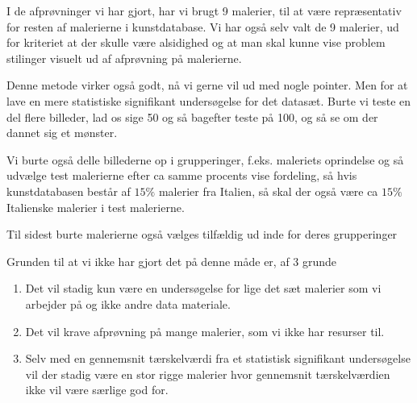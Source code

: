 I de afprøvninger vi har gjort, har vi brugt 9 malerier, til at være
repræsentativ for resten af malerierne i kunstdatabase. Vi har også selv
valt de 9 malerier, ud for kriteriet at der skulle være alsidighed og at
man skal kunne vise problem stilinger visuelt ud af afprøvning på
malerierne.

Denne metode virker også godt, nå vi gerne vil ud med nogle pointer.
Men for at lave en mere statistiske signifikant undersøgelse for det
datasæt. Burte vi teste en del flere billeder, lad os sige 50 og
så bagefter teste på 100, og så se om der dannet sig et mønster. 

Vi burte også delle billederne op i grupperinger, f.eks. maleriets
oprindelse og så udvælge test malerierne efter ca samme procents vise
fordeling, så hvis kunstdatabasen består af $15 \%$ malerier fra
Italien, så skal der også være ca $15 \%$ Italienske malerier i test
malerierne.

Til sidest burte malerierne også vælges tilfældig ud inde for deres
grupperinger

Grunden til at vi ikke har gjort det på denne måde er, af 3 grunde

\begin{enumerate}
	\item Det vil stadig kun være en undersøgelse for lige det sæt
	malerier som vi arbejder på og ikke andre data materiale.
	\item Det vil krave afprøvning på mange malerier, som vi ikke har
	resurser til. 
	\item Selv med en gennemsnit tærskelværdi fra et statistisk
	signifikant undersøgelse vil der stadig være en stor rigge malerier
	hvor gennemsnit tærskelværdien ikke vil være særlige god for. 
\end{enumerate}
